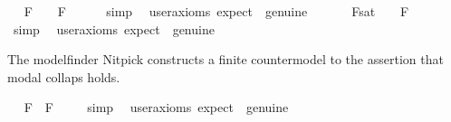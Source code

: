 \begin{isabellebody}
\ \isamarkupfalse%
\ {\isachardoublequoteopen}{\isacharbrackleft}{\isasymA}{\isasymphi}\isactrlsup F{\isacharbrackright}\ {\isacharequal}\ {\isasymtop}\ {\isasymlongrightarrow}\ {\isacharbrackleft}\isactrlbold {\isasymbox}{\isasymphi}\isactrlsup F{\isacharbrackright}\ {\isacharequal}\ {\isasymtop}\ {\isachardoublequoteclose}%
\isadelimproof
\ %
\endisadelimproof
%
\isatagproof
{}\isamarkupfalse%
\ simp\ \isamarkupfalse%
\ {\isacharbrackleft}user{\isacharunderscore}axioms{\isacharcomma}\ expect\ {\isacharequal}\ genuine{\isacharbrackright}\ \isamarkupfalse%
\ \ %
%
\endisatagproof
{\isafoldproof}%
%
\isadelimproof
%
\endisadelimproof
\isanewline
\ \isamarkupfalse%
\ {\isachardoublequoteopen}{\isacharbrackleft}{\isasymphi}\isactrlsup F{\isacharbrackright}\isactrlsup s\isactrlsup a\isactrlsup t\ {\isacharequal}\ {\isasymtop}\ {\isasymlongrightarrow}\ {\isacharbrackleft}\isactrlbold {\isasymbox}{\isasymphi}\isactrlsup F{\isacharbrackright}\ {\isacharequal}\ {\isasymtop}\ {\isachardoublequoteclose}%
\isadelimproof
\ %
\endisadelimproof
%
\isatagproof
{}\isamarkupfalse%
\ simp\ \isamarkupfalse%
\ {\isacharbrackleft}user{\isacharunderscore}axioms{\isacharcomma}\ expect\ {\isacharequal}\ genuine{\isacharbrackright}\ \isamarkupfalse%
\ \ %
%
\endisatagproof
{\isafoldproof}%
%
\isadelimproof
%
\endisadelimproof
%
\isamarkuptrue%
%
\begin{isamarkuptext}%
The modelfinder Nitpick constructs a finite countermodel to the assertion
  that modal collaps holds.%
\end{isamarkuptext}\isamarkuptrue%
\ \isamarkupfalse%
\ {\isachardoublequoteopen}{\isacharbrackleft}{\isasymphi}\isactrlsup F\ \isactrlbold {\isasymrightarrow}\ \isactrlbold {\isasymbox}{\isasymphi}\isactrlsup F{\isacharbrackright}\ {\isacharequal}\ {\isasymtop}{\isachardoublequoteclose}%
\isadelimproof
\ %
\endisadelimproof
%
\isatagproof
{}\isamarkupfalse%
\ simp\ \isamarkupfalse%
\ {\isacharbrackleft}user{\isacharunderscore}axioms{\isacharcomma}\ expect\ {\isacharequal}\ genuine{\isacharbrackright}\ \isamarkupfalse%
\ %
%
\endisatagproof
{\isafoldproof}%
%
\isadelimproof
%
\endisadelimproof
%
\isamarkuptrue%

\end{isabellebody}
